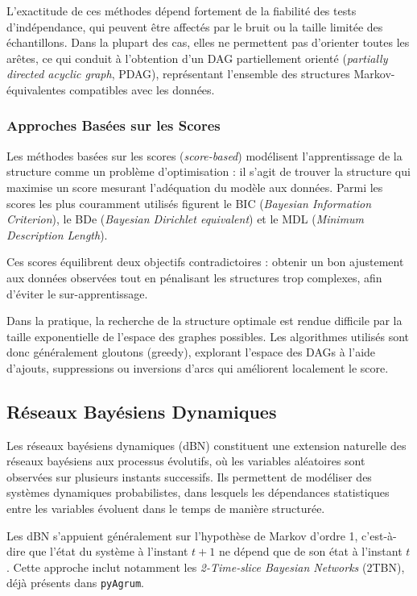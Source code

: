\documentclass{article}
\begin{document}
L'exactitude de ces méthodes dépend fortement de la fiabilité des tests d'indépendance, qui peuvent être
affectés par le bruit ou la taille limitée des échantillons. Dans la plupart des cas, elles ne permettent pas d'orienter
toutes les arêtes, ce qui conduit à l'obtention d'un DAG partiellement orienté (\textit{partially directed acyclic graph},
PDAG), représentant l'ensemble des structures Markov-équivalentes compatibles avec les données.

\subsubsection{Approches Basées sur les Scores}

Les méthodes basées sur les scores (\textit{score-based}) modélisent l'apprentissage de la structure comme un
problème d'optimisation : il s'agit de trouver la structure qui maximise un score mesurant l'adéquation du
modèle aux données. Parmi les scores les plus couramment utilisés figurent le BIC (\textit{Bayesian Information Criterion}),
le BDe (\textit{Bayesian Dirichlet equivalent}) et le MDL (\textit{Minimum Description Length}).

Ces scores équilibrent deux objectifs contradictoires : obtenir un bon ajustement aux données observées tout en
pénalisant les structures trop complexes, afin d'éviter le sur-apprentissage.

Dans la pratique, la recherche de la structure optimale est rendue difficile par la taille exponentielle de l'espace
des graphes possibles. Les algorithmes utilisés sont donc généralement gloutons (greedy), explorant l'espace des
DAGs à l'aide d'ajouts, suppressions ou inversions d'arcs qui améliorent localement le score.

\subsection{Réseaux Bayésiens Dynamiques}

Les réseaux bayésiens dynamiques (dBN) constituent une extension naturelle des réseaux bayésiens aux processus
évolutifs, où les variables aléatoires sont observées sur plusieurs instants successifs. Ils permettent de modéliser
des systèmes dynamiques probabilistes, dans lesquels les dépendances statistiques entre les variables évoluent dans
le temps de manière structurée.

Les dBN s'appuient généralement sur l'hypothèse de Markov d'ordre 1, c'est-à-dire que l'état du système à l'instant
$t+1$ ne dépend que de son état à l'instant $t$. Cette approche inclut notamment les \textit{2-Time-slice Bayesian Networks}
(2TBN), déjà présents dans \texttt{pyAgrum}.
\end{document}
